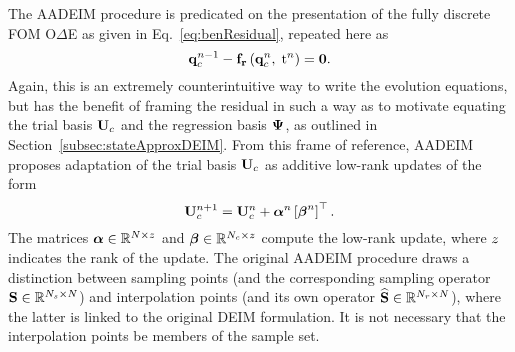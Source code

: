 The AADEIM procedure is predicated on the presentation of the fully discrete FOM O$\Delta$E as given in Eq.~\ref{eq:benResidual}, repeated here as
%
\begin{equation}
	\mathbf{q}_{c}^{n-1} - \mathbf{f}_{\mathbf{r}}\left(\mathbf{q}_{c}^{n},\; \text{t}^{n}\right) = \mathbf{0}.
\end{equation}
%
Again, this is an extremely counterintuitive way to write the evolution equations, but has the benefit of framing the residual in such a way as to motivate equating the trial basis $\consTrial$ and the regression basis $\deimBasis$, as outlined in Section~\ref{subsec:stateApproxDEIM}. From this frame of reference, AADEIM proposes adaptation of the trial basis $\consTrial$ as additive low-rank updates of the form
%
\begin{equation}
	\consTrial^{\timeIdx+1} = \consTrial^{\timeIdx} + \adeimAlpha^{\timeIdx} \left[\adeimBeta^{\timeIdx}\right]^\top.
\end{equation}
%
The matrices $\boldsymbol{\alpha} \in \mathbb{R}^{N \times z}$ and $\boldsymbol{\beta} \in \mathbb{R}^{N_c \times z}$ compute the low-rank update, where $z$ indicates the rank of the update. The original AADEIM procedure draws a distinction between sampling points (and the corresponding sampling operator $\mathbf{S} \in \mathbb{R}^{N_s \times N}$) and interpolation points (and its own operator $\mathbf{\widehat{S}} \in \mathbb{R}^{N_r \times N}$), where the latter is linked to the original DEIM formulation. It is not necessary that the interpolation points be members of the sample set.

